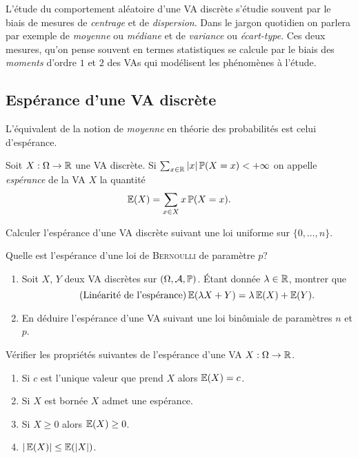 \documentclass[11pt, a4paper]{article}
\begin{document}
L'étude du comportement aléatoire d'une VA discrète s'étudie souvent
par le biais de mesures de \emph{centrage} et de
\emph{dispersion}. Dans le jargon quotidien on parlera par exemple de
\textit{moyenne} ou \textit{médiane} et de \textit{variance} ou
\textit{écart-type}. Ces deux mesures, qu'on pense souvent en termes
statistiques se calcule par le biais des \emph{moments} d'ordre $1$ et
$2$ des VAs qui modélisent les phénomènes à l'étude.

\subsection{Espérance d'une VA discrète}
\label{sec:esperance}

L'équivalent de la notion de \emph{moyenne} en théorie des
probabilités est celui d'espérance.
\begin{defn}
  Soit $X : \Omega \to \mathbb{R}$ une VA discrète. Si
  $\sum_{x\in \mathbb{R}} |x|\operatorname{\mathbb{P}}(X = x) < + \infty$ on appelle
  \emph{espérance} de la VA $X$ la quantité
  \[
    \operatorname{\mathbb{E}}(X) = \sum_{x \in X} x\operatorname{\mathbb{P}}(X = x).
  \]
\end{defn}
\begin{question}
  Calculer l'espérance d'une VA discrète suivant une loi uniforme sur
  $\{0, \ldots, n\}$.
\end{question}
\begin{question}
  Quelle est l'espérance d'une loi de \textsc{Bernoulli} de paramètre $p$?
\end{question}
\begin{question}
  \begin{enumerate}
  \item
    Soit $X$, $Y$ deux VA discrètes sur $(\Omega, \mathcal{A}, \operatorname{\mathbb{P}})$. Étant
    donnée $\lambda \in \mathbb{R}$, montrer que
    \begin{equation}
      \label{eq:linearitesperance}
      \tag{Linéarité de l'espérance}
      \operatorname{\mathbb{E}}(\lambda X + Y) = \lambda\operatorname{\mathbb{E}}(X) + \operatorname{\mathbb{E}}(Y).
    \end{equation}
  \item En déduire l'espérance d'une VA suivant une loi binômiale de
    paramètres $n$ et $p$.
  \end{enumerate}
\end{question}
\begin{question}
  Vérifier les propriétés suivantes de l'espérance d'une VA
  $X : \Omega \to \mathbb{R}$.
  \begin{enumerate}
  \item Si $c$ est l'unique valeur que prend $X$ alors $\operatorname{\mathbb{E}}(X) = c$.
  \item Si $X$ est bornée $X$ admet une espérance.
  \item Si $X \geq 0$ alors $\operatorname{\mathbb{E}}(X) \geq 0$.
  \item $|\operatorname{\mathbb{E}}(X)| \leq \operatorname{\mathbb{E}}(|X|)$.
  \end{enumerate}
\end{question}
\end{document}
